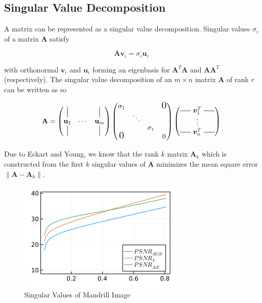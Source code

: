 \documentclass[conference]{IEEEtran}
\newcommand*{\vertbar}{\rule[-1ex]{0.5pt}{1.5em}}
\newcommand*{\horzbar}{\rule[0.5ex]{1.5em}{0.5pt}}
\begin{document}
\subsection{Singular Value Decomposition}

A matrix can be represented as a singular value decomposition.
Singular values $\sigma_i$ of a matrix $\mathbf{A}$ satisfy

\begin{equation}
    \mathbf{A}\mathbf{v}_i = \sigma_i\mathbf{u}_i
\end{equation}

with orthonormal $\mathbf{v}_i$ and $\mathbf{u}_i$ forming an eigenbasis for $\mathbf{A}^T\mathbf{A}$ and $\mathbf{AA}^T$ (respectively).
The singular value decomposition of an $m\times n$ matrix $\mathbf{A}$ of rank $r$ can be written as so

\begin{equation}
    \mathbf{A} = 
    \begin{pmatrix}
        \vertbar && \vertbar \\
        \mathbf{u}_1 & \cdots & \mathbf{u}_m \\
        \vertbar && \vertbar \\
    \end{pmatrix}
    \begin{pmatrix}
        \sigma_1 &&&\text{\Large0} \\ 
        & \ddots && \\
        && \sigma_r & \\
        \text{\Large0}&&& 0 \\
    \end{pmatrix}
    \begin{pmatrix}\horzbar~\bm{v}^T_1~\horzbar\\\vdots\\\horzbar~\bm{v}^T_n~\horzbar\end{pmatrix}
\end{equation}

Due to Eckart and Young, we know that the rank $k$ matrix $\mathbf{A}_k$ which is constructed from the first $k$ singular values of $\mathbf{A}$ minimizes the mean square error $\left\lVert\mathbf{A}-\mathbf{A}_k\right\rVert$.

\begin{figure}[htbp]
    \centering
    \includegraphics[width=0.7\columnwidth]{images/mandrill_SVD.png}
    \caption{Singular Values of Mandrill Image}
    \label{fig:svd}
\end{figure}
\end{document}
